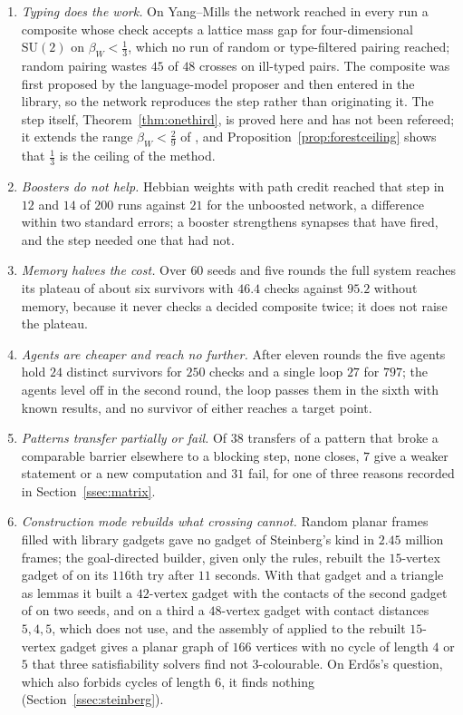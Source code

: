 \begin{enumerate}[label=(\roman*),leftmargin=1.8em,itemsep=1pt]
\item \emph{Typing does the work.} On Yang--Mills the network reached in every run a composite whose check accepts a lattice mass gap for four-dimensional $\mathrm{SU}(2)$ on $\beta_{W}<\frac13$, which no run of random or type-filtered pairing reached; random pairing wastes $45$ of $48$ crosses on ill-typed pairs. The composite was first proposed by the language-model proposer and then entered in the library, so the network reproduces the step rather than originating it. The step itself, Theorem~\ref{thm:onethird}, is proved here and has not been refereed; it extends the range $\beta_{W}<\frac29$ of \cite{BB26d}, and Proposition~\ref{prop:forestceiling} shows that $\frac13$ is the ceiling of the method.
\item \emph{Boosters do not help.} Hebbian weights with path credit reached that step in $12$ and $14$ of $200$ runs against $21$ for the unboosted network, a difference within two standard errors; a booster strengthens synapses that have fired, and the step needed one that had not.
\item \emph{Memory halves the cost.} Over $60$ seeds and five rounds the full system reaches its plateau of about six survivors with $46.4$ checks against $95.2$ without memory, because it never checks a decided composite twice; it does not raise the plateau.
\item \emph{Agents are cheaper and reach no further.} After eleven rounds the five agents hold $24$ distinct survivors for $250$ checks and a single loop $27$ for $797$; the agents level off in the second round, the loop passes them in the sixth with known results, and no survivor of either reaches a target point.
\item \emph{Patterns transfer partially or fail.} Of $38$ transfers of a pattern that broke a comparable barrier elsewhere to a blocking step, none closes, $7$ give a weaker statement or a new computation and $31$ fail, for one of three reasons recorded in Section~\ref{ssec:matrix}.
\item \emph{Construction mode rebuilds what crossing cannot.} Random planar frames filled with library gadgets gave no gadget of Steinberg's kind in $2.45$ million frames; the goal-directed builder, given only the rules, rebuilt the $15$-vertex gadget of \cite{CHK17} on its $116$th try after $11$ seconds. With that gadget and a triangle as lemmas it built a $42$-vertex gadget with the contacts of the second gadget of \cite{CHK17} on two seeds, and on a third a $48$-vertex gadget with contact distances $5,4,5$, which \cite{CHK17} does not use, and the assembly of \cite{CHK17} applied to the rebuilt $15$-vertex gadget gives a planar graph of $166$ vertices with no cycle of length $4$ or $5$ that three satisfiability solvers find not $3$-colourable. On Erd\H{o}s's question, which also forbids cycles of length $6$, it finds nothing (Section~\ref{ssec:steinberg}).

\end{enumerate}
